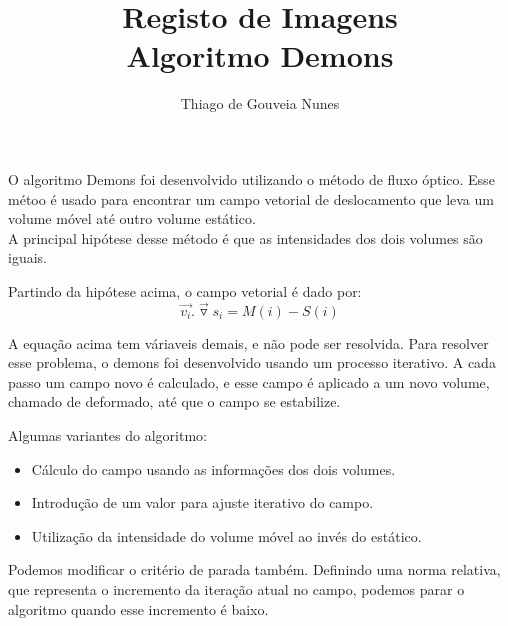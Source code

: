 \documentclass[compress]{beamer}
\title{Registo de Imagens\\Algoritmo Demons}
\author{Thiago de Gouveia Nunes}
\date{}
\begin{document}
\frame{\titlepage}

\begin{frame}
  O algoritmo Demons foi desenvolvido utilizando o método de fluxo óptico. Esse métoo é usado para encontrar um campo vetorial de deslocamento que leva
  um volume móvel até outro volume estático. \\
  A principal hipótese desse método é que as intensidades dos dois volumes são iguais.
\end{frame}

\begin{frame}
  Partindo da hipótese acima, o campo vetorial é dado por: \\
  \begin{equation*}
    \overrightarrow{v_i} . \overrightarrow{\triangledown}s_i = M(i) - S(i)
  \end{equation*}
\end{frame}

\begin{frame}
  A equação acima tem váriaveis demais, e não pode ser resolvida. Para resolver esse problema, o demons foi desenvolvido usando um processo
  iterativo. A cada passo um campo novo é calculado, e esse campo é aplicado a um novo volume, chamado de deformado, até que o campo se estabilize.
\end{frame}

\begin{frame}
  Algumas variantes do algoritmo:
  \begin{itemize}
    \item Cálculo do campo usando as informações dos dois volumes. \\
    \item Introdução de um valor para ajuste iterativo do campo. \\
    \item Utilização da intensidade do volume móvel ao invés do estático.
  \end{itemize}
\end{frame}

\begin{frame}
  Podemos modificar o critério de parada também. Definindo uma norma relativa, que representa o incremento da iteração atual no campo, podemos parar o
  algoritmo quando esse incremento é baixo.
\end{frame}
\end{document}
